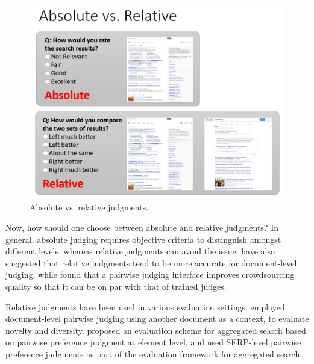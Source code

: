 \begin{figure}
	\begin{center}
		\includegraphics[scale=0.5]{images/judgment_types}
		\caption{Absolute vs. relative judgments.} 
		\label{fig:judgment_types}
	\end{center}
\end{figure}

Now, how should one choose between absolute and relative judgments? In general, absolute judging requires objective criteria to distinguish amongst different levels, whereas relative judgments can avoid the issue. \cite{CarteretteBCD08} have also suggested that relative judgments tend to be more accurate for document-level judging, while \cite{Kazai:2013} found that a pairwise judging interface improves crowdsourcing quality so that it can be on par with that of trained judges.

Relative judgments have been used in various evaluation settings. \cite{Chandar2013} employed document-level pairwise judging using another document as a context, to evaluate novelty and diversity. \cite{Arguello:2011} proposed an evaluation scheme for aggregated search based on pairwise preference judgment at element level, and \cite{Zhou:2012} used SERP-level pairwise preference judgments as part of the evaluation framework for aggregated search.

